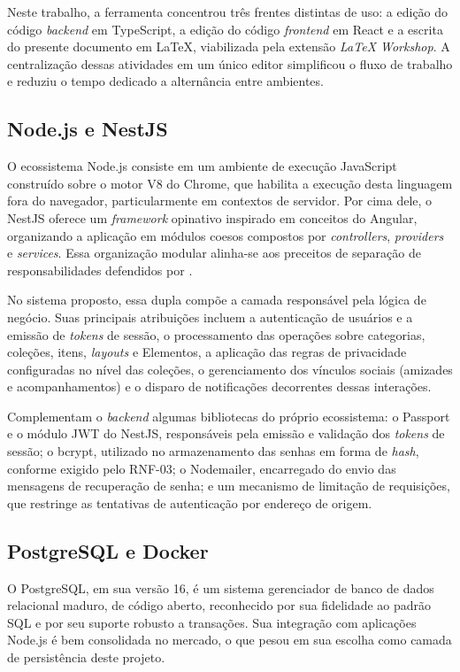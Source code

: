Neste trabalho, a ferramenta concentrou três frentes distintas de uso: a edição do código \textit{backend} em TypeScript, a edição do código \textit{frontend} em React e a escrita do presente documento em LaTeX, viabilizada pela extensão \textit{LaTeX Workshop}. A centralização dessas atividades em um único editor simplificou o fluxo de trabalho e reduziu o tempo dedicado a alternância entre ambientes.

\subsection{Node.js e NestJS}

O ecossistema Node.js consiste em um ambiente de execução JavaScript construído sobre o motor V8 do Chrome, que habilita a execução desta linguagem fora do navegador, particularmente em contextos de servidor. Por cima dele, o NestJS oferece um \textit{framework} opinativo inspirado em conceitos do Angular, organizando a aplicação em módulos coesos compostos por \textit{controllers}, \textit{providers} e \textit{services}. Essa organização modular alinha-se aos preceitos de separação de responsabilidades defendidos por \cite{Fowler2002}.

No sistema proposto, essa dupla compõe a camada responsável pela lógica de negócio. Suas principais atribuições incluem a autenticação de usuários e a emissão de \textit{tokens} de sessão, o processamento das operações sobre categorias, coleções, itens, \textit{layouts} e Elementos, a aplicação das regras de privacidade configuradas no nível das coleções, o gerenciamento dos vínculos sociais (amizades e acompanhamentos) e o disparo de notificações decorrentes dessas interações.

Complementam o \textit{backend} algumas bibliotecas do próprio ecossistema: o Passport e o módulo JWT do NestJS, responsáveis pela emissão e validação dos \textit{tokens} de sessão; o bcrypt, utilizado no armazenamento das senhas em forma de \textit{hash}, conforme exigido pelo RNF-03; o Nodemailer, encarregado do envio das mensagens de recuperação de senha; e um mecanismo de limitação de requisições, que restringe as tentativas de autenticação por endereço de origem.

\subsection{PostgreSQL e Docker}

O PostgreSQL, em sua versão 16, é um sistema gerenciador de banco de dados relacional maduro, de código aberto, reconhecido por sua fidelidade ao padrão SQL e por seu suporte robusto a transações. Sua integração com aplicações Node.js é bem consolidada no mercado, o que pesou em sua escolha como camada de persistência deste projeto.

